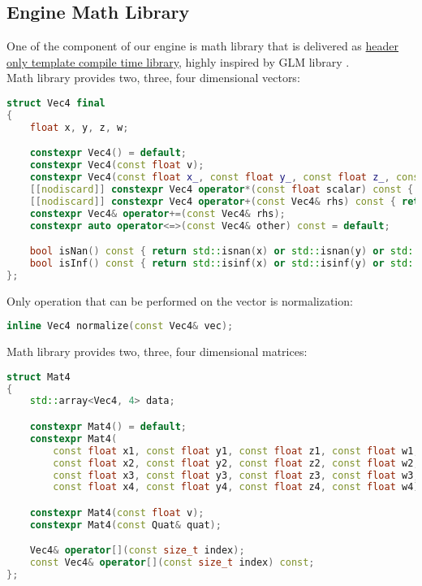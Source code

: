 \newpage

\subsection{Engine Math Library}
\label{sec:math}
\hspace{\parindent}
One of the component of our engine is math library that is delivered as \hyperref[sec:build_struct]{header only template compile time library}, highly inspired by GLM library \cite{glm}.\\Math library provides two, three, four dimensional vectors:
\begin{lstlisting}[language=c++, caption=Vector class(./engine/include/tsengine/math.hpp)]
struct Vec4 final
{
    float x, y, z, w;

    constexpr Vec4() = default;
    constexpr Vec4(const float v);
    constexpr Vec4(const float x_, const float y_, const float z_, const float w_);
    [[nodiscard]] constexpr Vec4 operator*(const float scalar) const { return {x * scalar, y * scalar, z * scalar, w * scalar}; }
    [[nodiscard]] constexpr Vec4 operator+(const Vec4& rhs) const { return {x + rhs.x, y + rhs.y, z + rhs.z, w + rhs.w}; }
    constexpr Vec4& operator+=(const Vec4& rhs);
    constexpr auto operator<=>(const Vec4& other) const = default;

    bool isNan() const { return std::isnan(x) or std::isnan(y) or std::isnan(z) or std::isnan(w); }
    bool isInf() const { return std::isinf(x) or std::isinf(y) or std::isinf(z) or std::isinf(w); }
};
\end{lstlisting}
Only operation that can be performed on the vector is normalization:
\begin{lstlisting}[language=c++, caption=Vector operations(./engine/include/tsengine/math.hpp)]
inline Vec4 normalize(const Vec4& vec);
\end{lstlisting}
Math library provides two, three, four dimensional matrices:
\label{sec:mat}
\begin{lstlisting}[language=c++, caption=Matrix class(./engine/include/tsengine/math.hpp)]
struct Mat4
{
    std::array<Vec4, 4> data;

    constexpr Mat4() = default;
    constexpr Mat4(
        const float x1, const float y1, const float z1, const float w1,
        const float x2, const float y2, const float z2, const float w2,
        const float x3, const float y3, const float z3, const float w3,
        const float x4, const float y4, const float z4, const float w4);

    constexpr Mat4(const float v);
    constexpr Mat4(const Quat& quat);

    Vec4& operator[](const size_t index);
    const Vec4& operator[](const size_t index) const;
};
\end{lstlisting}
